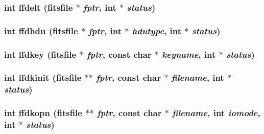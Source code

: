 \subsubsection{\setlength{\rightskip}{0pt plus 5cm}int ffdelt (\bf{fitsfile} $\ast$ {\em fptr}, int $\ast$ {\em status})}\label{test_2shm__client_2fitsio_8h_02d32917d27a457a77ac003c7c6295dd}


\subsubsection{\setlength{\rightskip}{0pt plus 5cm}int ffdhdu (\bf{fitsfile} $\ast$ {\em fptr}, int $\ast$ {\em hdutype}, int $\ast$ {\em status})}\label{test_2shm__client_2fitsio_8h_8805c9b8c1cc419ceb3e0f9e6779e6c4}


\subsubsection{\setlength{\rightskip}{0pt plus 5cm}int ffdkey (\bf{fitsfile} $\ast$ {\em fptr}, const char $\ast$ {\em keyname}, int $\ast$ {\em status})}\label{test_2shm__client_2fitsio_8h_c07173729eb0c7f54c9b10e14dcc581f}


\subsubsection{\setlength{\rightskip}{0pt plus 5cm}int ffdkinit (\bf{fitsfile} $\ast$$\ast$ {\em fptr}, const char $\ast$ {\em filename}, int $\ast$ {\em status})}\label{test_2shm__client_2fitsio_8h_9d80b85b1dd87a39313c42076dfccdcc}


\subsubsection{\setlength{\rightskip}{0pt plus 5cm}int ffdkopn (\bf{fitsfile} $\ast$$\ast$ {\em fptr}, const char $\ast$ {\em filename}, int {\em iomode}, int $\ast$ {\em status})}\label{test_2shm__client_2fitsio_8h_891bfcf028003e840a9f554842123fce}


